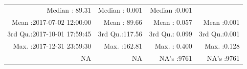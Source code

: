 \documentclass[
  10pt,
  a4paper,oneside]{article}
\begin{document}
\begin{longtable}[]{@{}rrrr@{}}
\begin{minipage}[t]{0.19\columnwidth}
Median : 89.31\strut
\end{minipage} & \begin{minipage}[t]{0.19\columnwidth}\raggedleft
Median : 0.001\strut
\end{minipage} & \begin{minipage}[t]{0.19\columnwidth}\raggedleft
Median :0.001\strut
\end{minipage}\tabularnewline
\begin{minipage}[t]{0.33\columnwidth}\raggedleft
Mean :2017-07-02 12:00:00\strut
\end{minipage} & \begin{minipage}[t]{0.19\columnwidth}\raggedleft
Mean : 89.66\strut
\end{minipage} & \begin{minipage}[t]{0.19\columnwidth}\raggedleft
Mean : 0.057\strut
\end{minipage} & \begin{minipage}[t]{0.19\columnwidth}\raggedleft
Mean :0.001\strut
\end{minipage}\tabularnewline
\begin{minipage}[t]{0.33\columnwidth}\raggedleft
3rd Qu.:2017-10-01 17:59:45\strut
\end{minipage} & \begin{minipage}[t]{0.19\columnwidth}\raggedleft
3rd Qu.:117.56\strut
\end{minipage} & \begin{minipage}[t]{0.19\columnwidth}\raggedleft
3rd Qu.: 0.099\strut
\end{minipage} & \begin{minipage}[t]{0.19\columnwidth}\raggedleft
3rd Qu.:0.001\strut
\end{minipage}\tabularnewline
\begin{minipage}[t]{0.33\columnwidth}\raggedleft
Max. :2017-12-31 23:59:30\strut
\end{minipage} & \begin{minipage}[t]{0.19\columnwidth}\raggedleft
Max. :162.81\strut
\end{minipage} & \begin{minipage}[t]{0.19\columnwidth}\raggedleft
Max. : 0.400\strut
\end{minipage} & \begin{minipage}[t]{0.19\columnwidth}\raggedleft
Max. :0.128\strut
\end{minipage}\tabularnewline
\begin{minipage}[t]{0.33\columnwidth}\raggedleft
NA\strut
\end{minipage} & \begin{minipage}[t]{0.19\columnwidth}\raggedleft
NA\strut
\end{minipage} & \begin{minipage}[t]{0.19\columnwidth}\raggedleft
NA's :9761\strut
\end{minipage} & \begin{minipage}[t]{0.19\columnwidth}\raggedleft
NA's :9761\strut
\end{minipage}\tabularnewline
\bottomrule
\end{longtable}
\end{document}

